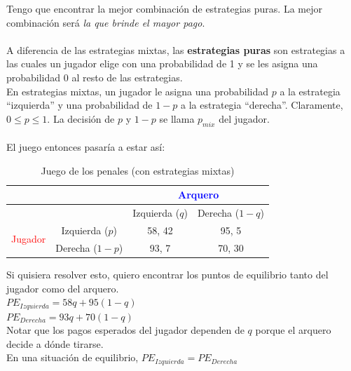 \documentclass{article}
\begin{document}
                Tengo que encontrar la mejor combinación de estrategias puras. La mejor combinación será \emph{la que brinde el mayor pago}. \\
                \\
                A diferencia de las estrategias mixtas, las \textbf{estrategias puras} son estrategias a las cuales un jugador elige con una probabilidad de 1 y se les asigna una probabilidad 0 al resto de las estrategias. \\
                En estrategias mixtas, un jugador le asigna una probabilidad \(p\) a la estrategia ``izquierda'' y una probabilidad de \(1-p\) a la estrategia ``derecha''. Claramente, \(0 \leq p \leq 1\). La decisión de \(p\) y \(1-p\) se llama \(p_{mix}\) del jugador. \\
                \\
                El juego entonces pasaría a estar así:
                \begin{table}[H]
                    \centering
                        \begin{tabular}{|c|c|c|c|}
                        \hline
                        & & \multicolumn{2}{c|}{\textcolor{Blue}{Arquero}} \\ \hline
                                                & & Izquierda ($q$) & Derecha ($1-q$) \\ \hline
                        \multirow{2}{*}{\textcolor{Red}{Jugador}} 
                                                & Izquierda ($p$) & 58, 42 & 95, 5 \\ \cline{2-4} 
                                                & Derecha ($1-p$) & 93, 7 & 70, 30 \\ \hline
                        \end{tabular}
                    \caption{Juego de los penales (con estrategias mixtas)}
                \end{table}
                Si quisiera resolver esto, quiero encontrar los puntos de equilibrio tanto del jugador como del arquero. \\
                \(PE_{Izquierda} = 58q + 95(1-q)\) \\
                \(PE_{Derecha} = 93q + 70(1-q)\) \\
                Notar que los pagos esperados del jugador dependen de $q$ porque el arquero decide a dónde tirarse. \\
                En una situación de equilibrio, \(PE_{Izquierda} = PE_{Derecha}\) \\
\end{document}
